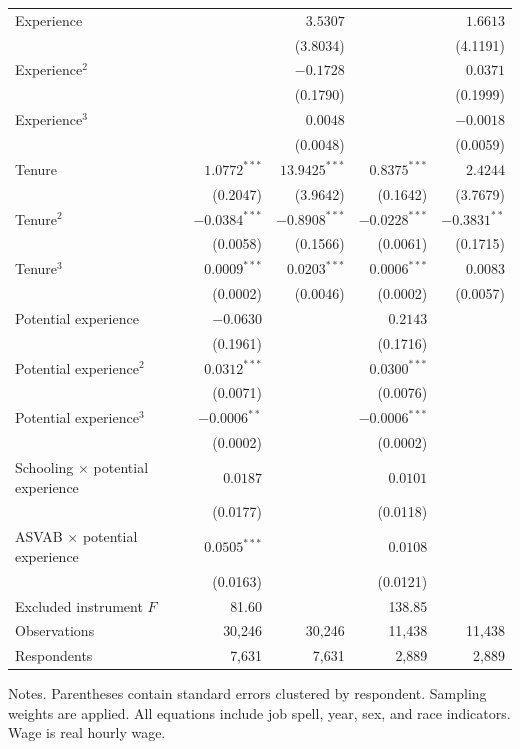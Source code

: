 \documentclass[11pt]{article}
\begin{document}
\begin{table}[p]
\begin{threeparttable}
\begin{tabular*}{\textwidth}{@{\extracolsep{\fill}}p{}rrrr@{}}
\addlinespace[2pt]
Experience &  & $3.5307$ &  & $1.6613$ \\
 &  & (3.8034) &  & (4.1191) \\
Experience$^2$ &  & $-0.1728$ &  & $0.0371$ \\
 &  & (0.1790) &  & (0.1999) \\
Experience$^3$ &  & $0.0048$ &  & $-0.0018$ \\
 &  & (0.0048) &  & (0.0059) \\
\addlinespace[2pt]
Tenure & $1.0772^{***}$ & $13.9425^{***}$ & $0.8375^{***}$ & $2.4244$ \\
 & (0.2047) & (3.9642) & (0.1642) & (3.7679) \\
Tenure$^2$ & $-0.0384^{***}$ & $-0.8908^{***}$ & $-0.0228^{***}$ & $-0.3831^{**}$ \\
 & (0.0058) & (0.1566) & (0.0061) & (0.1715) \\
Tenure$^3$ & $0.0009^{***}$ & $0.0203^{***}$ & $0.0006^{***}$ & $0.0083$ \\
 & (0.0002) & (0.0046) & (0.0002) & (0.0057) \\
\addlinespace[2pt]
Potential experience & $-0.0630$ &  & $0.2143$ &  \\
 & (0.1961) &  & (0.1716) &  \\
Potential experience$^2$ & $0.0312^{***}$ &  & $0.0300^{***}$ &  \\
 & (0.0071) &  & (0.0076) &  \\
Potential experience$^3$ & $-0.0006^{**}$ &  & $-0.0006^{***}$ &  \\
 & (0.0002) &  & (0.0002) &  \\
Schooling $\times$ potential experience & $0.0187$ &  & $0.0101$ &  \\
 & (0.0177) &  & (0.0118) &  \\
ASVAB $\times$ potential experience & $0.0505^{***}$ &  & $0.0108$ &  \\
 & (0.0163) &  & (0.0121) &  \\
\midrule
Excluded instrument $F$ & 81.60 &  & 138.85 &  \\
Observations & 30,246 & 30,246 & 11,438 & 11,438 \\
Respondents & 7,631 & 7,631 & 2,889 & 2,889 \\
\bottomrule
\end{tabular*}
\begin{tablenotes}[flushleft]\fontsize{9}{10.5}\selectfont
\item Notes. Parentheses contain standard errors clustered by respondent. Sampling weights are applied. All equations include job spell, year, sex, and race indicators. Wage is real hourly wage.

\end{tablenotes}
\end{threeparttable}
\end{table}
\end{document}

